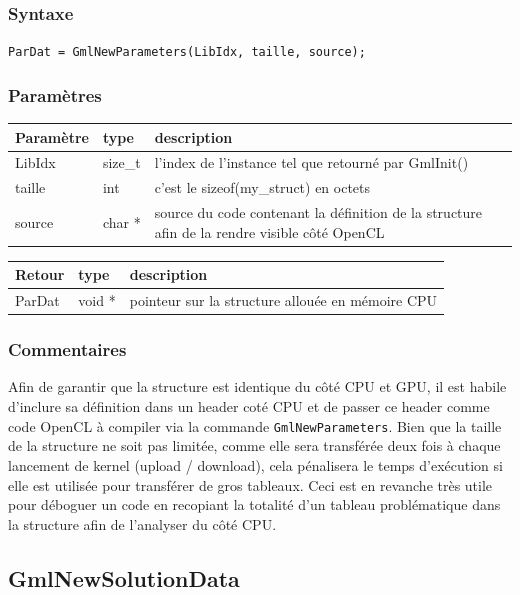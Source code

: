 \documentclass[a4paper,12pt]{article}
\begin{document}
\subsubsection*{Syntaxe}

{\tt ParDat = GmlNewParameters(LibIdx, taille, source);}

\subsubsection*{Paramètres}

\begin{tabular}{|m{2cm}|m{1.5cm}|m{10.5cm}|}
\hline
Paramètre  & type    & description \\
\hline
LibIdx     & size\_t & l'index de l'instance tel que retourné par GmlInit() \\
\hline
taille     & int     & c'est le sizeof(my\_struct) en octets \\
\hline
source     & char *  & source du code contenant la définition de la structure afin de la rendre visible côté OpenCL \\
\hline
\end{tabular}

\medskip

\begin{tabular}{|m{2cm}|m{1.5cm}|m{10.5cm}|}
\hline
Retour     & type   & description \\
\hline
ParDat     & void * & pointeur sur la structure allouée en mémoire CPU \\
\hline
\end{tabular}

\subsubsection*{Commentaires}
Afin de garantir que la structure est identique du côté CPU et GPU, il est habile d'inclure sa définition dans un header coté CPU et de passer ce header comme code OpenCL à compiler via la commande {\tt GmlNewParameters}.
Bien que la taille de la structure ne soit pas limitée, comme elle sera transférée deux fois à chaque lancement de kernel (upload / download), cela pénalisera le temps d'exécution si elle est utilisée pour transférer de gros tableaux.
Ceci est en revanche très utile pour déboguer un code en recopiant la totalité d'un tableau problématique dans la structure afin de l'analyser du côté CPU.


\subsection{GmlNewSolutionData}
\end{document}
